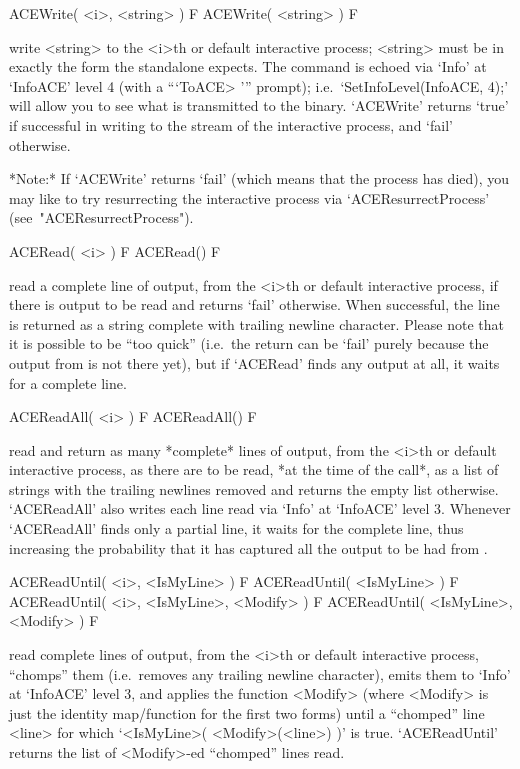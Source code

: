 \>ACEWrite( <i>, <string> ) F
\>ACEWrite( <string> ) F

write <string> to the <i>th or  default  interactive  {\ACE}  process;
<string> must be in exactly the form the  {\ACE}  standalone  expects.
The command is  echoed  via  `Info'  at  `InfoACE'  level  4  (with  a
```ToACE> ''' prompt); i.e.~`SetInfoLevel(InfoACE, 4);'  will  allow  you to
see what is transmitted to the {\ACE} binary. `ACEWrite' returns `true'
if successful in writing to the stream of the interactive {\ACE} process,
and `fail' otherwise.

*Note:*
If `ACEWrite' returns `fail' (which means that the {\ACE} process  has
died), you may like to try resurrecting the interactive {\ACE} process
via `ACEResurrectProcess' (see~"ACEResurrectProcess").

\>ACERead( <i> ) F
\>ACERead() F

read a complete line of {\ACE}  output,  from  the  <i>th  or  default
interactive {\ACE} process, if there is output to be read and  returns
`fail' otherwise. When successful, the line is returned  as  a  string
complete with trailing newline  character.  Please  note  that  it  is
possible to be ``too quick'' (i.e.~the return  can  be  `fail'  purely
because the output from {\ACE} is not there  yet),  but  if  `ACERead'
finds any output at all, it waits for a complete line.

\>ACEReadAll( <i> ) F
\>ACEReadAll() F

read and return as many *complete* lines of {\ACE}  output,  from  the
<i>th or default interactive {\ACE} process, as there are to be  read,
*at the time of the call*, as a list  of  strings  with  the  trailing
newlines removed and returns the empty  list  otherwise.  `ACEReadAll'
also writes each line read via `Info' at `InfoACE' level  3.  Whenever
`ACEReadAll' finds only a partial line,  it  waits  for  the  complete
line, thus increasing the probability that it  has  captured  all  the
output to be had from {\ACE}.

\>ACEReadUntil( <i>, <IsMyLine> ) F
\>ACEReadUntil( <IsMyLine> ) F
\>ACEReadUntil( <i>, <IsMyLine>, <Modify> ) F
\>ACEReadUntil( <IsMyLine>, <Modify> ) F

read complete lines of  {\ACE}  output,  from  the  <i>th  or  default
interactive {\ACE} process, ``chomps'' them (i.e.~removes any trailing
newline character), emits them to `Info' at  `InfoACE'  level  3,  and
applies the function <Modify> (where <Modify>  is  just  the  identity
map/function for the first two forms) until a ``chomped'' line  <line>
for which `<IsMyLine>( <Modify>(<line>)  )'  is  true.  `ACEReadUntil'
returns the list of <Modify>-ed ``chomped'' lines read.

